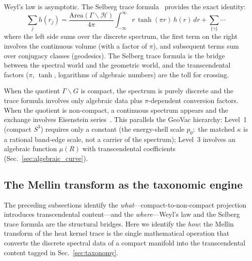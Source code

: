 \documentclass[aps,pra,twocolumn,superscriptaddress,longbibliography]{revtex4-2}
\begin{document}
Weyl's law is asymptotic.  The Selberg trace
formula~\cite{selberg1956} provides the exact identity:
\begin{equation}
  \sum_j h(r_j)
  = \frac{\mathrm{Area}(\Gamma \backslash \mathcal{H})}{4\pi}
    \int_{-\infty}^{\infty} r\,\tanh(\pi r)\,h(r)\,dr
    + \sum_{\{\gamma\}} \cdots
  \label{eq:selberg}
\end{equation}
where the left side sums over the discrete spectrum, the first
term on the right involves the continuous volume (with a factor
of $\pi$), and subsequent terms sum over conjugacy classes
(geodesics).  The Selberg trace formula is the bridge between
the spectral world and the geometric world, and the
transcendental factors ($\pi$, $\tanh$, logarithms of
algebraic numbers) are the toll for crossing.

When the quotient $\Gamma \backslash G$ is compact, the spectrum
is purely discrete and the trace formula involves only algebraic
data plus $\pi$-dependent conversion factors.  When the quotient
is non-compact, a continuous spectrum appears and the exchange
involves Eisenstein series~\cite{selberg1956}.  This parallels the
GeoVac hierarchy: Level~1 (compact $S^3$) requires only a constant
(the energy-shell scale $p_0$;\ the matched $\kappa$ is a rational
band-edge scale, not a carrier of the spectrum); Level~3 involves an algebraic function $\mu(R)$ with
transcendental coefficients (Sec.~\ref{sec:algebraic_curve}).

\subsection{The Mellin transform as the taxonomic engine}
\label{sec:mellin}

The preceding subsections identify the \emph{what}---compact-to-non-compact
projection introduces transcendental content---and the \emph{where}---Weyl's
law and the Selberg trace formula are the structural bridges.  Here we
identify the \emph{how}: the Mellin transform of the heat kernel trace is
the single mathematical operation that converts the discrete spectral data
of a compact manifold into the transcendental content tagged in
Sec.~\ref{sec:taxonomy}.
\end{document}
